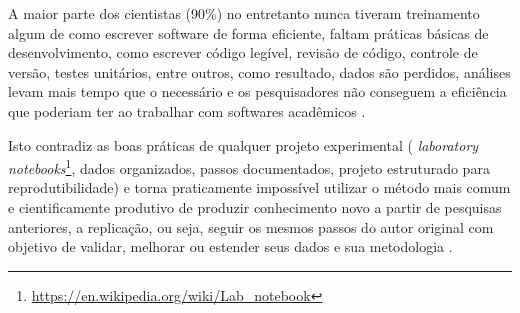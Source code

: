 A maior parte dos cientistas (90\%) no entretanto nunca tiveram treinamento
algum de como escrever software de forma eficiente, faltam práticas básicas de
desenvolvimento, como escrever código legível, revisão de código, controle de
versão, testes unitários, entre outros, como resultado, dados são perdidos,
análises levam mais tempo que o necessário e os pesquisadores não conseguem a
eficiência que poderiam ter ao trabalhar com softwares acadêmicos
\cite{wilson2017good}.


%

Isto contradiz as boas práticas de qualquer projeto experimental ({\it
laboratory
notebooks}\footnote{\url{https://en.wikipedia.org/wiki/Lab_notebook}}, dados
organizados, passos documentados, projeto estruturado para reprodutibilidade) e
torna praticamente impossível utilizar o método mais comum e cientificamente
produtivo de produzir conhecimento novo a partir de pesquisas anteriores, a
replicação, ou seja, seguir os mesmos passos do autor original com
objetivo de validar, melhorar ou estender seus dados e sua metodologia
\cite{king1995replication, Stodden2010}.

